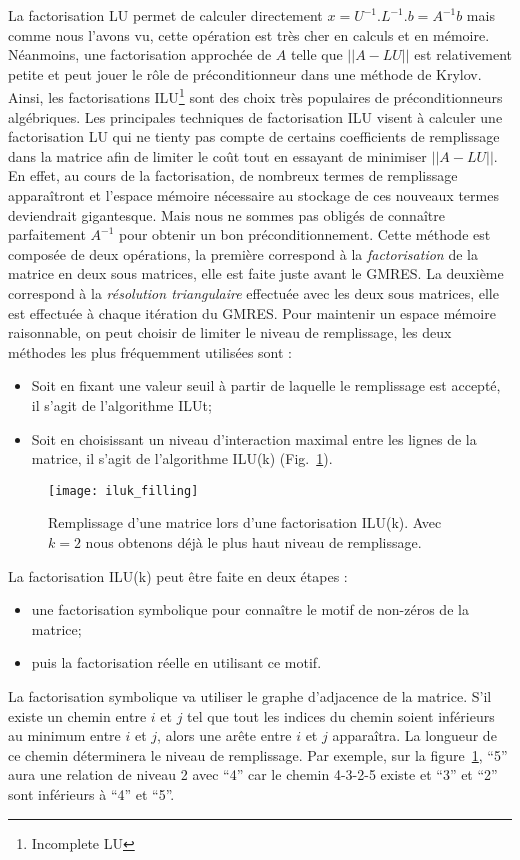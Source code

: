 La factorisation LU permet de calculer directement $x=U^{-1}.L^{-1}.b=A^{-1}b$ mais comme nous l'avons vu, cette opération est très cher en calculs et en mémoire.
%
Néanmoins, une factorisation approchée de $A$ telle que $||A-LU||$ est relativement petite et peut jouer le rôle de préconditionneur dans une méthode de Krylov.
%
Ainsi, les factorisations ILU\footnote{Incomplete LU}\cite{Saad96IMSLS} sont des choix très populaires de préconditionneurs algébriques.
%
Les principales techniques de factorisation ILU visent à calculer une factorisation LU qui ne tienty pas compte de certains coefficients de remplissage dans la matrice afin de limiter le coût tout en essayant de minimiser $||A-LU||$.
%
En effet, au cours de la factorisation, de nombreux termes de remplissage apparaîtront et l'espace mémoire nécessaire au stockage de ces nouveaux termes deviendrait gigantesque.
%
Mais nous ne sommes pas obligés de connaître parfaitement $A^{-1}$ pour obtenir un bon préconditionnement.
%
Cette méthode est composée de deux opérations, la première correspond à la {\em factorisation} de la matrice en deux sous matrices, elle est faite juste avant le GMRES.
%
La deuxième correspond à la {\em résolution triangulaire} effectuée avec les deux sous matrices, elle est effectuée à chaque itération du GMRES.
%
Pour maintenir un espace mémoire raisonnable, on peut choisir de limiter le niveau de remplissage, les deux méthodes les plus fréquemment utilisées sont :
\begin{itemize}
  \item Soit en fixant une valeur seuil à partir de laquelle le remplissage est accepté, il s'agit de l'algorithme ILUt;
  \item Soit en choisissant un niveau d'interaction maximal entre les lignes de la matrice, il s'agit de l'algorithme ILU(k) (Fig.~\ref{fig:iluk_filling}).
\end{itemize}

\begin{figure}[!h]
  \centering
  \texttt{[image: iluk\_filling]}
  \caption{Remplissage d'une matrice lors d'une factorisation ILU(k). Avec $k=2$ nous obtenons déjà le plus haut niveau de remplissage.}
  \label{fig:iluk_filling}
\end{figure}

La factorisation ILU(k) peut être faite en deux étapes :
\begin{itemize}
  \item une factorisation symbolique pour connaître le motif de non-zéros de la matrice;
  \item puis la factorisation réelle en utilisant ce motif.
\end{itemize}
%
La factorisation symbolique va utiliser le graphe d'adjacence de la matrice.
%
S'il existe un chemin entre $i$ et $j$ tel que tout les indices du chemin soient inférieurs au minimum entre $i$ et $j$, alors une arête entre $i$ et $j$ apparaîtra.
%
La longueur de ce chemin déterminera le niveau de remplissage.
%
Par exemple, sur la figure~\ref{fig:iluk_filling}, ``5'' aura une relation de niveau 2 avec ``4'' car le chemin 4-3-2-5 existe et ``3'' et ``2'' sont inférieurs à ``4'' et ``5''.

